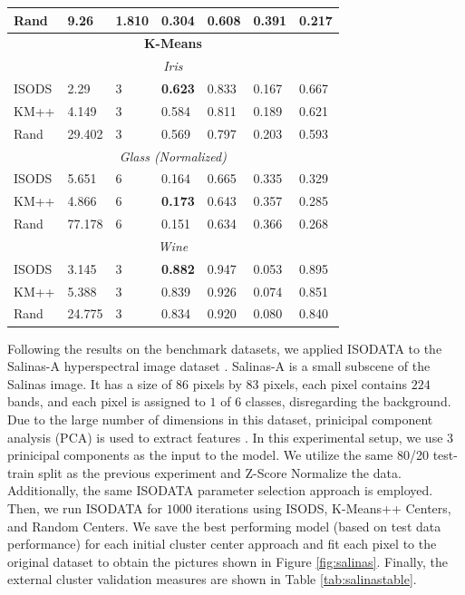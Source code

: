 \documentclass[a4paper, 10pt]{article}
\begin{document}
\begin{table}[ht]
\begin{tabular}{ |p{1.25cm}||p{1.25cm} p{1.25cm} p{1.25cm} p{1.25cm} p{1.25cm} p{1.25cm}|}
            Rand  & 9.26   & 1.810    & 0.304           & 0.608 & 0.391 & 0.217  \\
            \hline 
            \multicolumn{7}{|c|}{\textbf{K-Means}}                               \\
            \hline
            \multicolumn{7}{|c|}{\textit{Iris}}                                  \\
            \hline
            ISODS & 2.29   & 3        & \textbf{0.623}  & 0.833 & 0.167 & 0.667  \\
            KM++  & 4.149  & 3        & 0.584           & 0.811 & 0.189 & 0.621  \\
            Rand  & 29.402 & 3        & 0.569           & 0.797 & 0.203 & 0.593  \\
            \hline
            \multicolumn{7}{|c|}{\textit{Glass (Normalized)}}                    \\
            \hline
            ISODS & 5.651  & 6        & 0.164           & 0.665 & 0.335 & 0.329  \\
            KM++  & 4.866  & 6        & \textbf{0.173}  & 0.643 & 0.357 & 0.285  \\
            Rand  & 77.178 & 6        & 0.151           & 0.634 & 0.366 & 0.268  \\
            \hline
            \multicolumn{7}{|c|}{\textit{Wine}}                                  \\
            \hline
            ISODS & 3.145  & 3        & \textbf{0.882}  & 0.947 & 0.053 & 0.895  \\
            KM++  & 5.388  & 3        & 0.839           & 0.926 & 0.074 & 0.851  \\
            Rand  & 24.775 & 3        & 0.834           & 0.920 & 0.080 & 0.840  \\
            \hline
      \end{tabular}
      \label{tab:ucitable}
\end{table}

Following the results on the benchmark datasets, we applied ISODATA to the
Salinas-A hyperspectral image dataset \cite{Salinas}. Salinas-A is a small
subscene of the Salinas image. It has a size of $86$ pixels by $83$ pixels, each
pixel contains $224$ bands, and each pixel is assigned to $1$ of $6$ classes,
disregarding the background. Due to the large number of dimensions in this
dataset, prinicipal component analysis (PCA) is used to extract features
\cite{Rodarmel2002}. In this experimental setup, we use $3$ prinicipal
components as the input to the model. We utilize the same 80/20 test-train split
as the previous experiment and Z-Score Normalize the data. Additionally, the
same ISODATA parameter selection approach is employed. Then, we run ISODATA for
$1000$ iterations using ISODS, K-Means++ Centers, and Random Centers. We save
the best performing model (based on test data performance) for each initial
cluster center approach and fit each pixel to the original dataset to obtain the
pictures shown in Figure \ref{fig:salinas}. Finally, the external cluster
validation measures are shown in Table \ref{tab:salinastable}. 
\end{document}

